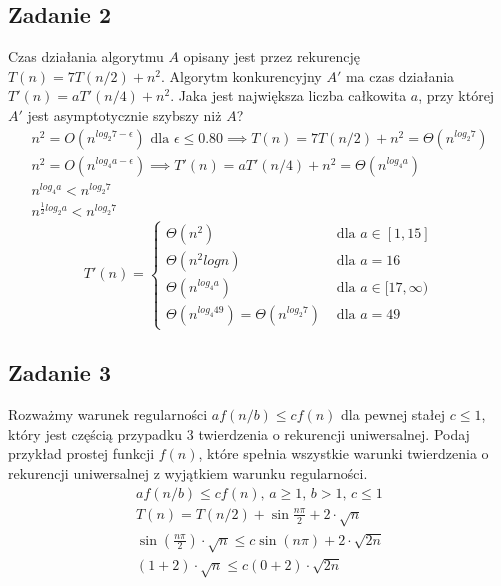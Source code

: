 \documentclass{article}
\begin{document}
\subsection*{Zadanie 2}
Czas działania algorytmu $A$ opisany jest przez rekurencję $T(n) = 7T(n/2) + n^2$.
Algorytm konkurencyjny $A'$ ma czas działania $T '(n) = aT'(n/4) + n^2$. Jaka jest największa
liczba całkowita $a$, przy której $A'$ jest asymptotycznie szybszy niż $A$?
\begin{gather*}
    n^2 = O\left(n^{log_2 7-\epsilon}\right) \text{ dla } \epsilon \leq 0.80 \implies T(n) = 7T(n/2) + n^2 = \Theta\left(n^{log_2 7}\right) \\
    n^2 = O\left(n^{log_4 a-\epsilon}\right) \implies T'(n) = aT'(n/4) + n^2 = \Theta\left(n^{log_4 a}\right) \\
    n^{log_4a} < n^{log_2 7} \\
    n^{\frac{1}{2}log_2a} < n^{log_2 7}
\end{gather*}
\begin{equation*}
    T'(n) = \begin{cases}
        \Theta\left(n^2\right)                                           & \text{ dla } a \in [1, 15]      \\
        \Theta\left(n^2logn\right)                                       & \text{ dla } a = 16             \\
        \Theta\left(n^{log_4 a}\right)                                   & \text{ dla } a \in [17, \infty) \\
        \Theta\left(n^{log_4 49}\right) = \Theta\left(n^{log_2 7}\right) & \text{ dla } a = 49
    \end{cases}
\end{equation*}

\subsection*{Zadanie 3}
Rozważmy warunek regularności $af(n/b) \leq cf(n)$ dla pewnej stałej $c \leq 1$, który jest
częścią przypadku 3 twierdzenia o rekurencji uniwersalnej. Podaj przykład prostej funkcji
$f(n)$, które spełnia wszystkie warunki twierdzenia o rekurencji uniwersalnej z wyjątkiem
warunku regularności.
\begin{gather*}
    af(n/b) \leq cf(n) \text{, } a \geq 1 \text{, } b > 1 \text{, } c \leq 1 \\
    T(n) = T(n/2) + \sin \frac{n \pi}{2} + 2 \cdot \sqrt{n} \\
    \sin\left(\frac{n \pi}{2}\right) \cdot \sqrt{n} \leq c \sin\left(n \pi\right) + 2 \cdot \sqrt{2n} \\
    (1 + 2) \cdot \sqrt{n} \leq c (0 + 2) \cdot \sqrt{2n}
\end{gather*}
\end{document}
